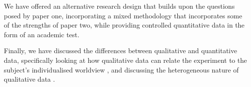\documentclass[12pt]{article}
\begin{document}
We have offered an alternative research design that builds upon the questions posed by paper one, incorporating a mixed methodology that incorporates some of the strengths of paper two, while providing controlled quantitative data in the form of an academic test.

Finally, we have discussed the differences between qualitative and quantitative data, specifically looking at how qualitative data can relate the experiment to the subject's individualised worldview \cite{mertens}, and discussing the heterogeneous nature of qualitative data \cite{allwood}.


\medskip




\end{document}
